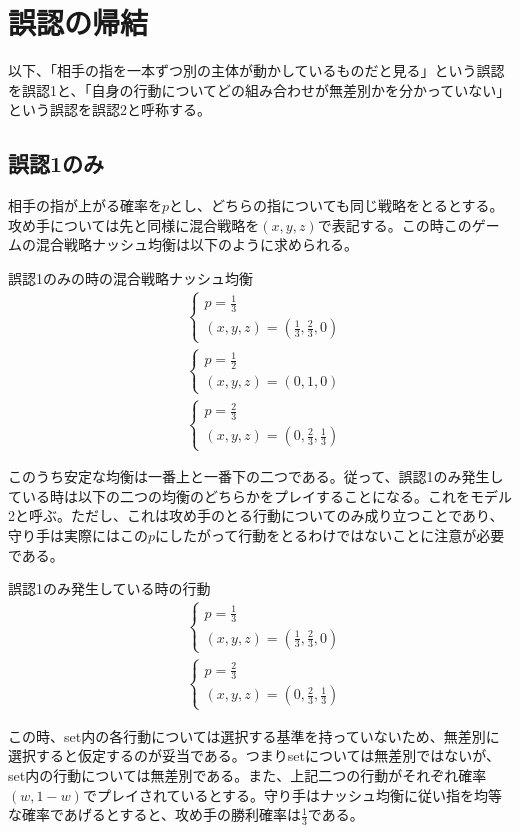 \documentclass{jsarticle}
\begin{document}
\section{誤認の帰結}
以下、「相手の指を一本ずつ別の主体が動かしているものだと見る」という誤認を誤認1と、「自身の行動についてどの組み合わせが無差別かを分かっていない」という誤認を誤認2と呼称する。
\subsection{誤認1のみ}
相手の指が上がる確率を$p$とし、どちらの指についても同じ戦略をとるとする。攻め手については先と同様に混合戦略を$(x, y, z)$で表記する。この時このゲームの混合戦略ナッシュ均衡は以下のように求められる。
\begin{itembox}[l]{誤認1のみの時の混合戦略ナッシュ均衡}
\begin{align*}
    	&\begin{cases}
		p = \frac{1}{3}\\
		(x, y, z) = (\frac{1}{3}, \frac{2}{3}, 0)
	\end{cases}\\[10pt]
	&\begin{cases}
		p = \frac{1}{2}\\
		(x, y, z) = (0, 1, 0)
	\end{cases}\\[10pt]
	&\begin{cases}
		p = \frac{2}{3}\\
		(x, y, z) = (0, \frac{2}{3}, \frac{1}{3})
	\end{cases}
\end{align*}
\end{itembox}
このうち安定な均衡は一番上と一番下の二つである。従って、誤認1のみ発生している時は以下の二つの均衡のどちらかをプレイすることになる。これをモデル2と呼ぶ。ただし、これは攻め手のとる行動についてのみ成り立つことであり、守り手は実際にはこの$p$にしたがって行動をとるわけではないことに注意が必要である。
\begin{itembox}[l]{誤認1のみ発生している時の行動}
\begin{align}
    	&\begin{cases}
		p = \frac{1}{3}\\
		(x, y, z) = (\frac{1}{3}, \frac{2}{3}, 0)
	\end{cases}\\[10pt]
	&\begin{cases}
		p = \frac{2}{3}\\
		(x, y, z) = (0, \frac{2}{3}, \frac{1}{3})
	\end{cases}
\end{align}
\end{itembox}
この時、set内の各行動については選択する基準を持っていないため、無差別に選択すると仮定するのが妥当である。つまりsetについては無差別ではないが、set内の行動については無差別である。また、上記二つの行動がそれぞれ確率$(w, 1-w)$でプレイされているとする。守り手はナッシュ均衡に従い指を均等な確率であげるとすると、攻め手の勝利確率は$\frac{1}{3}$である。
\end{document}
